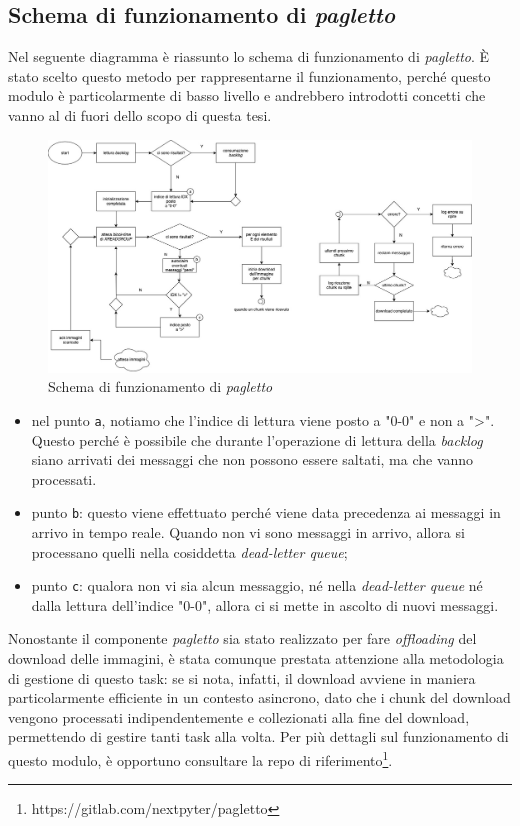 \subsection{Schema di funzionamento di \textit{pagletto}}
Nel seguente diagramma è riassunto lo schema di funzionamento di \textit{pagletto}. È stato scelto questo metodo per rappresentarne il funzionamento, perché questo modulo è particolarmente di basso livello e andrebbero introdotti concetti che vanno al di fuori dello scopo di questa tesi.
\begin{figure}[h]
    \centering
    \includegraphics[width=1\textwidth]{files/images/pagletto-diagram.jpg}
    \caption{Schema di funzionamento di \textit{pagletto}}
    \label{fig:pagletto-diagram}
\end{figure}
\begin{itemize}
    \item nel punto \verb|a|, notiamo che l'indice di lettura viene posto a "0-0" e non a ">". Questo perché è possibile che durante l'operazione di lettura della \textit{backlog} siano arrivati dei messaggi che non possono essere saltati, ma che vanno processati.
    \item punto \verb|b|: questo viene effettuato perché viene data precedenza ai messaggi in arrivo in tempo reale. Quando non vi sono messaggi in arrivo, allora si processano quelli nella cosiddetta \textit{dead-letter queue};
    \item punto \verb|c|: qualora non vi sia alcun messaggio, né nella \textit{dead-letter queue} né dalla lettura dell'indice "0-0", allora ci si mette in ascolto di nuovi messaggi.
\end{itemize}

Nonostante il componente \textit{pagletto} sia stato realizzato per fare \textit{offloading} del download delle immagini, è stata comunque prestata attenzione alla metodologia di gestione di questo task: se si nota, infatti, il download avviene in maniera particolarmente efficiente in un contesto asincrono, dato che i chunk del download vengono processati indipendentemente e collezionati alla fine del download, permettendo di gestire tanti task alla volta.
\newline
Per più dettagli sul funzionamento di questo modulo, è opportuno consultare la repo di riferimento\footnote{https://gitlab.com/nextpyter/pagletto}.
\newpage
